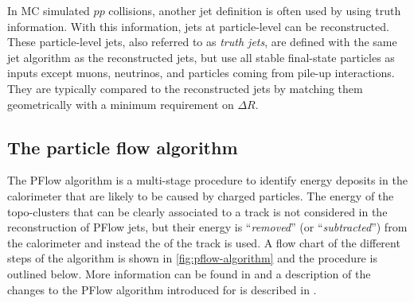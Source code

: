 
In MC simulated $pp$ collisions, another jet definition is often used by using truth information. With this information, jets at particle-level can be reconstructed. These particle-level jets, also referred to as \emph{truth jets}, are defined with the same jet algorithm as the reconstructed jets, but use all stable final-state particles as inputs except muons, neutrinos, and particles coming from pile-up interactions. They are typically compared to the reconstructed jets by matching them geometrically with a minimum requirement on $\Delta R$.




\subsection{The particle flow algorithm}
\label{subsec:pflow-algorithm}
The PFlow algorithm is a multi-stage procedure to identify energy deposits in the calorimeter that are likely to be caused by charged particles. The energy of the topo-clusters that can be clearly associated to a track is not considered in the reconstruction of PFlow jets, but their energy is ``\emph{removed}'' (or ``\emph{subtracted}'') from the calorimeter and instead the \pT of the track is used. A flow chart of the different steps of the algorithm is shown in \cref{fig:pflow-algorithm} and the procedure is outlined below. More information can be found in  and a description of the changes to the PFlow algorithm introduced for \RunTwo is described in .

